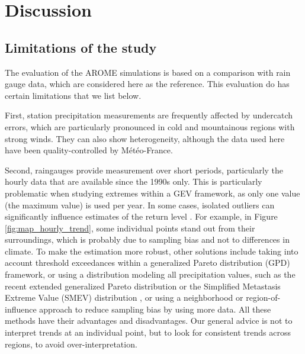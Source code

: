 \documentclass[french,a4paper,DIV=11,numbers=noendperiod]{scrartcl}
\begin{document}


\section{Discussion}\label{discussion}

\subsection{Limitations of the study}


The evaluation of the AROME simulations is based on a comparison with rain gauge data, which are considered here as the reference. This evaluation do has certain limitations that we list below.

First, station precipitation measurements are frequently affected by undercatch errors, which are particularly pronounced in cold and mountainous regions with strong winds. They can also show heterogeneity, although the data used here have been quality-controlled by Météo-France.

Second, raingauges provide measurement over short periods, particularly the hourly data that are available since the 1990s only. This is particularly problematic when studying extremes within a GEV framework, as only one value (the maximum value) is used per year. In some cases, isolated outliers can significantly influence estimates of the return level \parencite{Zeder2024}. 
For example, in Figure \ref{fig:map_hourly_trend}, some individual points stand out from their surroundings, which is probably due to sampling bias and not to differences in climate. To make the estimation more robust, other solutions include taking into account threshold exceedances within a generalized Pareto distribution (GPD) framework, or using a distribution modeling all precipitation values, such as the recent extended generalized Pareto distribution \parencite{haruna-etal-2025} or the Simplified Metastasis Extreme Value (SMEV) distribution \parencite{marra2020,correa2025,lompi2025}, or using a neighborhood or region-of-influence approach \parencite{blanchet2021explaining} to reduce sampling bias by using more data.
All these methods have their advantages and disadvantages. Our general advice is not to interpret trends at an individual point, but to look for consistent trends across regions, to avoid over-interpretation.
\end{document}

